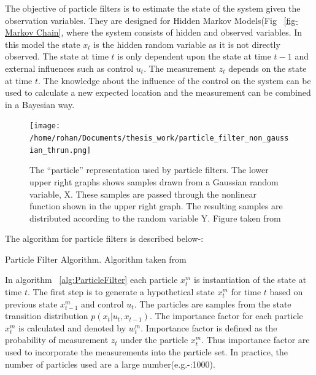 \documentclass[12pt,draft]{dalcsthesis}
\begin{document}
The objective of particle filters is to estimate the state of the system given the observation variables. They are designed for Hidden Markov Models(Fig ~\ref{fig-Markov Chain}, where the system consists of hidden and observed variables. In this model the state $x_{t}$ is the hidden random variable as it is not directly observed. The state at time $t$ is only dependent upon the state at time $t-1$ and external influences such as control $u_{t}$. The measurement $z_{t}$ depends on the state at time $t$. The knowledge about the influence of the control on the system can be used to calculate a new expected location and the measurement can be combined in a Bayesian way.


\begin{figure}
\centering
{\texttt{[image: /home/rohan/Documents/thesis\_work/particle\_filter\_non\_gaussian\_thrun.png]}}

\caption{\label{fig: partilce representation} The ``particle'' representation used by particle filters. The lower upper right graphs shows samples drawn from a Gaussian random variable, X. These samples are passed through the nonlinear function shown in the upper right graph. The resulting samples are distributed according to the random variable Y. Figure taken from \cite{thrun2005probabilistic}}
\end{figure}


The algorithm for particle filters is described below-:

\begin{algorithm}[H]
\label{alg:ParticleFilter}
 \SetAlgoLined
  		 


\caption{Particle Filter Algorithm. Algorithm taken from \cite{thrun2005probabilistic}}
\end{algorithm}

In algorithm ~\ref{alg:ParticleFilter} each particle $x_{t}^{m}$ is instantiation of the state at time $t$.  The first step is to generate a hypothetical state $x_{t}^{m}$ for time $t$ based on previous state $x_{t-1}^{m}$ and control $u_{t}$. The particles are samples from the state transition distribution $p(x_{t}|u_{t},x_{t-1})$. The importance factor for each particle $x_{t}^{m}$ is calculated and denoted by $w_{t}^{m}$. Importance factor is defined as the probability of measurement $z_{t}$ under the particle $x_{t}^{m}$. Thus importance factor are used to incorporate the measurements into the particle set. In practice, the number of particles used are a large number(e.g.-:1000).
\end{document}
